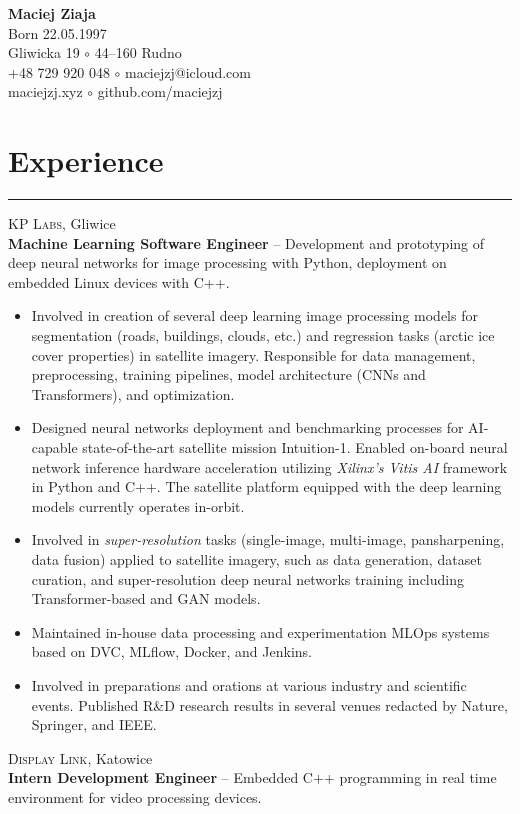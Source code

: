 \documentclass{article}
\begin{document}
\hfill
\begin{minipage}{0.5\textwidth}\raggedleft
	{\Large \textbf{Maciej Ziaja}} \\
	Born 22.05.1997 \\
	Gliwicka 19 $\circ$ 44--160 Rudno \\
	+48 729 920 048 $\circ$ maciejzj@icloud.com \\
	maciejzj.xyz $\circ$ github.com/maciejzj
\end{minipage}

\section*{Experience}

\hrule \medskip

\textsc{KP Labs}, Gliwice \\
\textbf{Machine Learning Software Engineer} -- Development and prototyping of
deep neural networks for image processing with Python, deployment on embedded
Linux devices with C++.
\begin{itemize}
	\item Involved in creation of several deep learning image processing models
		for segmentation (roads, buildings, clouds, etc.) and regression tasks
		(arctic ice cover properties) in satellite imagery. Responsible for
		data management, preprocessing, training pipelines, model architecture
		(CNNs and Transformers), and optimization.
	\item Designed neural networks deployment and benchmarking processes for
		AI-capable state-of-the-art satellite mission Intuition-1. Enabled
		on-board neural network inference hardware acceleration utilizing
		\textit{Xilinx's Vitis AI} framework in Python and C++. The satellite
		platform equipped with the deep learning models currently operates
		in-orbit.
	\item Involved in \textit{super-resolution} tasks (single-image,
		multi-image, pansharpening, data fusion) applied to satellite imagery,
		such as data generation, dataset curation, and super-resolution deep
		neural networks training including Transformer-based and GAN models.
	\item Maintained in-house data processing and experimentation MLOps systems
		based on DVC, MLflow, Docker, and Jenkins.
	\item Involved in preparations and orations at various industry and
		scientific events. Published R\&D research results in several venues
		redacted by Nature, Springer, and IEEE.
\end{itemize}
\textsc{Display Link}, Katowice \\
\textbf{Intern Development Engineer} -- Embedded C++ programming in real time
environment for video processing devices.
\end{document}
